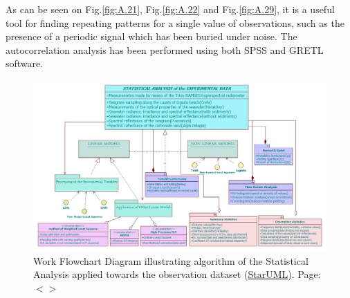 \documentclass[11pt]{article}
\begin{document}
As can be seen on Fig.\ref{fig:A.21}\label{A-23}, Fig.\ref{fig:A.22}\label{A-24} and Fig.\ref{fig:A.29}, it is a useful tool for finding repeating patterns for a single value of observations, such as the presence of a periodic signal which has been buried under noise. The autocorrelation analysis has been performed using both \ac{SPSS} and \ac{GRETL} software. 

\begin{figure}[H]
	\centering
	\includegraphics[scale=0.5, angle=90]{UML_StatAn.jpg}
	\caption{Work Flowchart Diagram illustrating algorithm of the Statistical Analysis applied towards the observation dataset (\href{http://staruml.sourceforge.net/en/}{StarUML}). Page: $<$\pageref{page-40}$>$}
	\label{fig:4.12}
\end{figure}
\end{document}
